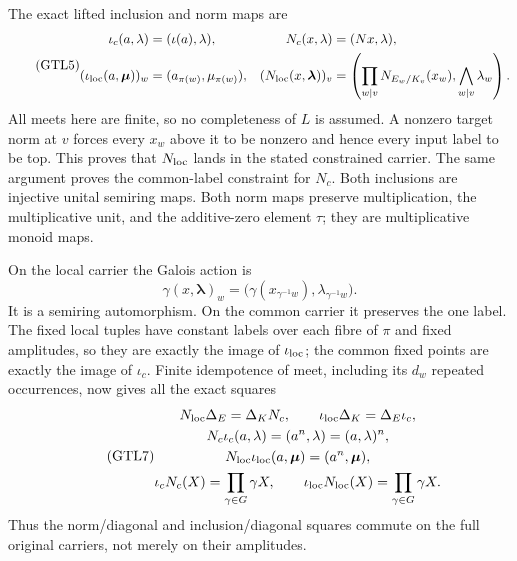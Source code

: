 The exact lifted inclusion and norm maps are
\begin{equation}\tag{GTL5}
 \begin{aligned}
 \iota_c(a,\lambda)&=(\iota(a),\lambda),&
 N_c(x,\lambda)&=(Nx,\lambda),\\
 (\iota_{\rm loc}(a,\boldsymbol\mu))_w
       &=(a_{\pi(w)},\mu_{\pi(w)}),&
 (N_{\rm loc}(x,\boldsymbol\lambda))_v
       &=\left(\prod_{w\mid v}N_{E_w/K_v}(x_w),
                         \bigwedge_{w\mid v}\lambda_w\right).
 \end{aligned}
\end{equation}
All meets here are finite, so no completeness of $L$ is assumed.
A nonzero target norm at $v$ forces every $x_w$ above it to be
nonzero and hence every input label to be top. This proves that
$N_{\rm loc}$ lands in the stated constrained carrier. The same
argument proves the common-label constraint for $N_c$.
Both inclusions are injective unital semiring maps. Both norm
maps preserve multiplication, the multiplicative unit, and the
additive-zero element $\tau$; they are multiplicative monoid maps.

On the local carrier the Galois action is
\begin{equation}\tag{GTL6}
 \gamma(x,\boldsymbol\lambda)_w
   =\bigl(\gamma(x_{\gamma^{-1}w}),\lambda_{\gamma^{-1}w}\bigr).
\end{equation}
It is a semiring automorphism. On the common carrier it preserves
the one label. The fixed local tuples have constant labels over
each fibre of $\pi$ and fixed amplitudes, so they are exactly the
image of $\iota_{\rm loc}$; the common fixed points are exactly
the image of $\iota_c$. Finite idempotence of meet, including its
$d_w$ repeated occurrences, now gives all the exact squares
\begin{equation}\tag{GTL7}
 \begin{gathered}
 N_{\rm loc}\Delta_E=\Delta_KN_c,\qquad
 \iota_{\rm loc}\Delta_K=\Delta_E\iota_c,\\
 N_c\iota_c(a,\lambda)=(a^n,\lambda)=(a,\lambda)^n,\\
 N_{\rm loc}\iota_{\rm loc}(a,\boldsymbol\mu)
                         =(a^n,\boldsymbol\mu),\\
 \iota_cN_c(X)=\prod_{\gamma\in G}\gamma X,\qquad
 \iota_{\rm loc}N_{\rm loc}(X)=\prod_{\gamma\in G}\gamma X.
 \end{gathered}
\end{equation}
Thus the norm/diagonal and inclusion/diagonal squares commute on
the full original carriers, not merely on their amplitudes.

